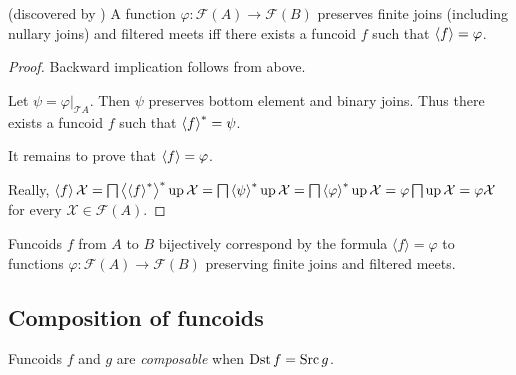 \begin{thm}
\label{fcd-as-func}(discovered by ) A function
$\varphi:\mathscr{F}(A)\rightarrow\mathscr{F}(B)$ preserves finite
joins (including nullary joins) and filtered meets iff there exists
a funcoid $f$ such that $\left\langle f\right\rangle=\varphi$.\end{thm}
\begin{proof}
Backward implication follows from above.

Let $\psi=\varphi|_{\mathscr{T}A}$. Then $\psi$ preserves bottom
element and binary joins. Thus there exists a funcoid $f$ such that
$\left\langle f\right\rangle ^{\ast}=\psi$.

It remains to prove that $\left\langle f\right\rangle=\varphi$.

Really, $\left\langle f\right\rangle\mathcal{X}=\bigsqcap\left\langle \left\langle f\right\rangle ^{\ast}\right\rangle ^{\ast}\operatorname{up}\mathcal{X}=\bigsqcap\left\langle \psi\right\rangle ^{\ast}\operatorname{up}\mathcal{X}=\bigsqcap\left\langle \varphi
\right\rangle ^{\ast}\operatorname{up}\mathcal{X}=\varphi\bigsqcap\operatorname{up}\mathcal{X}=\varphi\mathcal{X}$
for every $\mathcal{X}\in\mathscr{F}(A)$.\end{proof}
\begin{cor}
Funcoids $f$ from $A$ to $B$ bijectively correspond by the formula
$\langle f\rangle=\varphi$ to functions
$\varphi:\mathscr{F}(A)\rightarrow\mathscr{F}(B)$
preserving finite joins and filtered meets.
\end{cor}

\subsection{Composition of funcoids}
\begin{defn}
Funcoids $f$
and $g$ are \emph{composable} when $\operatorname{Dst} f=\operatorname{Src} g$.
\end{defn}

